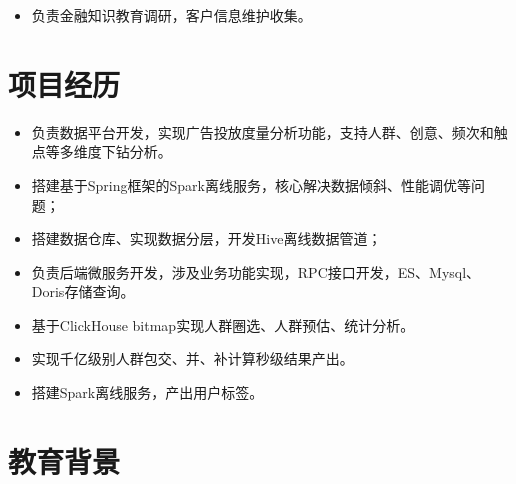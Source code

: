 \documentclass{resume}
\begin{document}
\begin{itemize}
  \item 负责金融知识教育调研，客户信息维护收集。
\end{itemize}

\section{项目经历}
\begin{itemize}
  \item 负责数据平台开发，实现广告投放度量分析功能，支持人群、创意、频次和触点等多维度下钻分析。
  \item 搭建基于Spring框架的Spark离线服务，核心解决数据倾斜、性能调优等问题；
  \item 搭建数据仓库、实现数据分层，开发Hive离线数据管道；
  \item 负责后端微服务开发，涉及业务功能实现，RPC接口开发，ES、Mysql、Doris存储查询。
\end{itemize}

\begin{itemize}
  \item 基于ClickHouse bitmap实现人群圈选、人群预估、统计分析。
  \item 实现千亿级别人群包交、并、补计算秒级结果产出。
  \item 搭建Spark离线服务，产出用户标签。
\end{itemize}

\section{教育背景}
\end{document}
